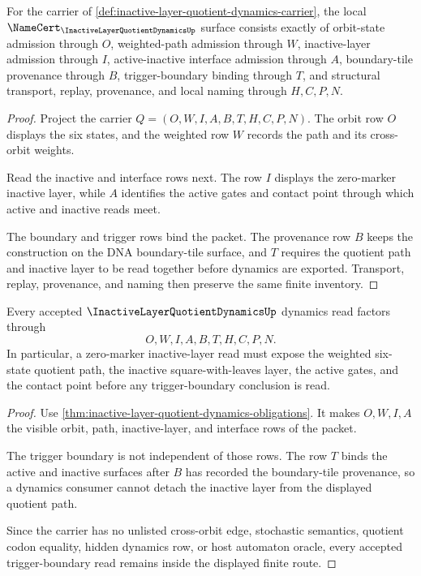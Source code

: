 \begin{theorem}
\label{thm:inactive-layer-quotient-dynamics-obligations}
For the carrier of \autoref{def:inactive-layer-quotient-dynamics-carrier}, the local $\NameCert_{\InactiveLayerQuotientDynamicsUp}$ surface consists exactly of orbit-state admission through $O$, weighted-path admission through $W$, inactive-layer admission through $I$, active-inactive interface admission through $A$, boundary-tile provenance through $B$, trigger-boundary binding through $T$, and structural transport, replay, provenance, and local naming through $H,C,P,N$.
\end{theorem}
\begin{proof}
Project the carrier $Q=(O,W,I,A,B,T,H,C,P,N)$. The orbit row $O$ displays the six states, and the weighted row $W$ records the path and its cross-orbit weights.

Read the inactive and interface rows next. The row $I$ displays the zero-marker inactive layer, while $A$ identifies the active gates and contact point through which active and inactive reads meet.

The boundary and trigger rows bind the packet. The provenance row $B$ keeps the construction on the DNA boundary-tile surface, and $T$ requires the quotient path and inactive layer to be read together before dynamics are exported. Transport, replay, provenance, and naming then preserve the same finite inventory.
\end{proof}

\begin{theorem}
\label{thm:inactive-layer-quotient-dynamics-trigger-boundary}
Every accepted $\InactiveLayerQuotientDynamicsUp$ dynamics read factors through
$$
O,W,I,A,B,T,H,C,P,N .
$$
In particular, a zero-marker inactive-layer read must expose the weighted six-state quotient path, the inactive square-with-leaves layer, the active gates, and the contact point before any trigger-boundary conclusion is read.
\end{theorem}
\begin{proof}
Use \autoref{thm:inactive-layer-quotient-dynamics-obligations}. It makes $O,W,I,A$ the visible orbit, path, inactive-layer, and interface rows of the packet.

The trigger boundary is not independent of those rows. The row $T$ binds the active and inactive surfaces after $B$ has recorded the boundary-tile provenance, so a dynamics consumer cannot detach the inactive layer from the displayed quotient path.

Since the carrier has no unlisted cross-orbit edge, stochastic semantics, quotient codon equality, hidden dynamics row, or host automaton oracle, every accepted trigger-boundary read remains inside the displayed finite route.
\end{proof}

